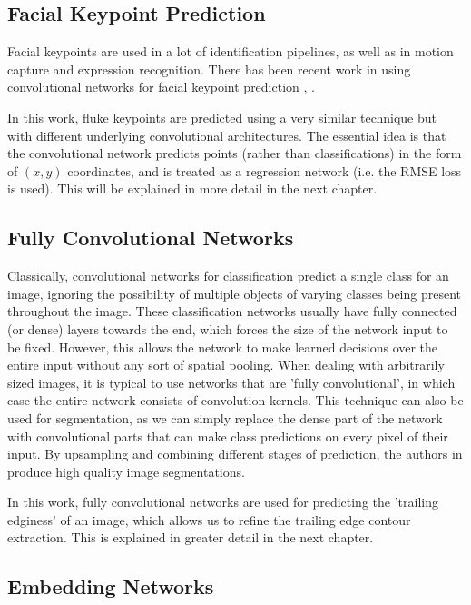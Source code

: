 \subsection{Facial Keypoint Prediction}

Facial keypoints are used in a lot of identification pipelines, as well as in motion capture and expression recognition.
There has been recent work in using convolutional networks for facial keypoint prediction \cite{sun2013deep}, \cite{nouri2014using}. 

In this work, fluke keypoints are predicted using a very similar technique but with different underlying convolutional architectures.
The essential idea is that the convolutional network predicts points (rather than classifications) in the form of $(x, y)$ coordinates, and is treated as a regression network (i.e. the RMSE loss is used). 
This will be explained in more detail in the next chapter.


\subsection{Fully Convolutional Networks}

Classically, convolutional networks for classification predict a single class for an image, ignoring the possibility of multiple objects of varying classes being present throughout the image.
These classification networks usually have fully connected (or dense) layers towards the end, which forces the size of the network input to be fixed.
However, this allows the network to make learned decisions over the entire input without any sort of spatial pooling.
When dealing with arbitrarily sized images, it is typical to use networks that are 'fully convolutional', in which case the entire network consists of convolution kernels. 
This technique can also be used for segmentation, as we can simply replace the dense part of the network with convolutional parts that can make class predictions on every pixel of their input.
By upsampling and combining different stages of prediction, the authors in \cite{long2015fully} produce high quality image segmentations.

In this work, fully convolutional networks are used for predicting the 'trailing edginess' of an image, which allows us to refine the trailing edge contour extraction. 
This is explained in greater detail in the next chapter.

\subsection{Embedding Networks}

